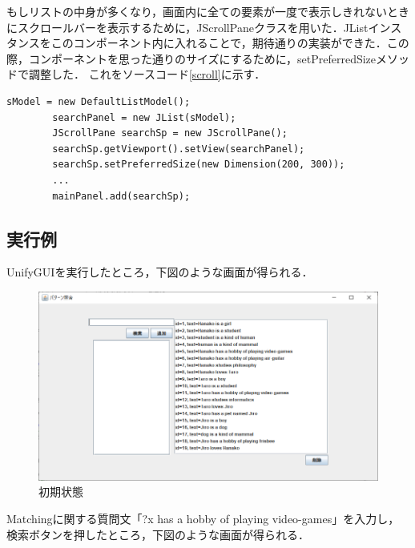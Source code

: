 \documentclass[12pt]{jarticle}
\begin{document}
もしリストの中身が多くなり，画面内に全ての要素が一度で表示しきれないときにスクロールバーを表示するために，JScrollPaneクラスを用いた．JListインスタンスをこのコンポーネント内に入れることで，期待通りの実装ができた．この際，コンポーネントを思った通りのサイズにするために，setPreferredSizeメソッドで調整した．
これをソースコード\ref{scroll}に示す．

\begin{lstlisting}[caption=UnifyGUIコンストラクタの一部, label=scroll]
        sModel = new DefaultListModel();
        searchPanel = new JList(sModel);
        JScrollPane searchSp = new JScrollPane();
        searchSp.getViewport().setView(searchPanel);
        searchSp.setPreferredSize(new Dimension(200, 300));
        ...
        mainPanel.add(searchSp);
\end{lstlisting}


\clearpage
\subsection{実行例}
UnifyGUIを実行したところ，下図のような画面が得られる．

\begin{figure}[!hbt]
  	\begin{center}
  		\includegraphics[scale=0.60]{images/scs2-3-1.png}
	\end{center}
  	\caption{初期状態}
\end{figure}
\clearpage

Matchingに関する質問文「?x has a hobby of playing video-games」を入力し，検索ボタンを押したところ，下図のような画面が得られる．
\end{document}
